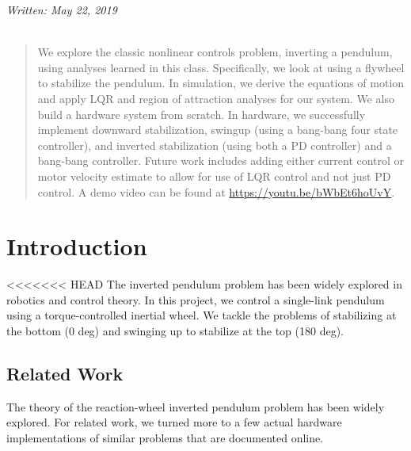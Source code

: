 \documentclass[conference]{IEEEtran}
\begin{document}
\maketitle
\noindent \textit{Written: May 22, 2019} \\ \\
\begin{abstract} We explore the classic nonlinear controls problem, inverting a
    pendulum, using analyses learned in this class. Specifically, we look at
    using a flywheel to stabilize the pendulum. In simulation, we derive the
    equations of motion and apply LQR and region of attraction analyses for our
    system. We also build a hardware system from scratch. In hardware, we
    successfully implement downward stabilization, swingup (using a bang-bang
    four state controller), and inverted stabilization (using both a PD
    controller) and a bang-bang controller. Future work includes adding either
    current control or motor velocity estimate to allow for use of LQR control 
    and not just PD control. A demo video can be found at \url{https://youtu.be/bWbEt6hoUvY}.
\end{abstract}


%
\IEEEpeerreviewmaketitle

\section{Introduction}
<<<<<<< HEAD
The inverted pendulum problem has been widely explored in robotics and control
theory. In this project, we control a single-link pendulum using a
torque-controlled inertial wheel. We tackle the problems of stabilizing at the
bottom (0 deg) and swinging up to stabilize at the top (180 deg). \\ 

\subsection{Related Work} The theory of the reaction-wheel inverted pendulum
problem has been widely explored. For related work, we turned more to a few
actual hardware implementations of similar problems that are documented online.
\end{document}
